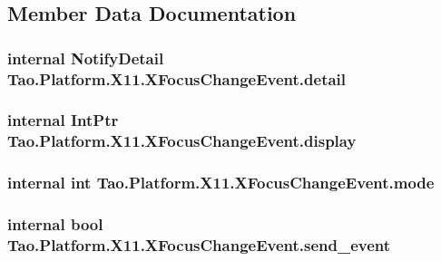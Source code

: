 \subsection{Member Data Documentation}
\hypertarget{struct_tao_1_1_platform_1_1_x11_1_1_x_focus_change_event_a5ce548b7cef942fbe0dd752ad1a05f9a}{
\subsubsection[{detail}]{\setlength{\rightskip}{0pt plus 5cm}internal {\bf NotifyDetail} {\bf Tao.Platform.X11.XFocusChangeEvent.detail}}}
\label{struct_tao_1_1_platform_1_1_x11_1_1_x_focus_change_event_a5ce548b7cef942fbe0dd752ad1a05f9a}
\hypertarget{struct_tao_1_1_platform_1_1_x11_1_1_x_focus_change_event_ac1779c075aa44938cb67f940764cb12e}{
\subsubsection[{display}]{\setlength{\rightskip}{0pt plus 5cm}internal IntPtr {\bf Tao.Platform.X11.XFocusChangeEvent.display}}}
\label{struct_tao_1_1_platform_1_1_x11_1_1_x_focus_change_event_ac1779c075aa44938cb67f940764cb12e}
\hypertarget{struct_tao_1_1_platform_1_1_x11_1_1_x_focus_change_event_a482c88260b2f17f3d84306bd4ef5696a}{
\subsubsection[{mode}]{\setlength{\rightskip}{0pt plus 5cm}internal int {\bf Tao.Platform.X11.XFocusChangeEvent.mode}}}
\label{struct_tao_1_1_platform_1_1_x11_1_1_x_focus_change_event_a482c88260b2f17f3d84306bd4ef5696a}
\hypertarget{struct_tao_1_1_platform_1_1_x11_1_1_x_focus_change_event_a6e500a566f49a40f29311262595a01be}{
\subsubsection[{send\_\-event}]{\setlength{\rightskip}{0pt plus 5cm}internal bool {\bf Tao.Platform.X11.XFocusChangeEvent.send\_\-event}}}
